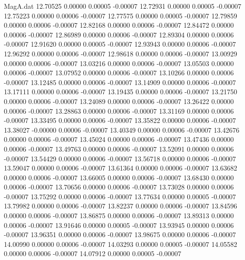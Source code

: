 \begin{filecontents}{MagA.dat}
  12.70525    0.00000    0.00005   -0.00007
  12.72931    0.00000    0.00005   -0.00007
  12.75223    0.00000    0.00006   -0.00007
  12.77575    0.00000    0.00005   -0.00007
  12.79859    0.00000    0.00006   -0.00007
  12.82168    0.00000    0.00006   -0.00007
  12.84472    0.00000    0.00006   -0.00007
  12.86989    0.00000    0.00006   -0.00007
  12.89304    0.00000    0.00006   -0.00007
  12.91620    0.00000    0.00005   -0.00007
  12.93943    0.00000    0.00006   -0.00007
  12.96292    0.00000    0.00006   -0.00007
  12.98618    0.00000    0.00006   -0.00007
  13.00929    0.00000    0.00006   -0.00007
  13.03216    0.00000    0.00006   -0.00007
  13.05503    0.00000    0.00006   -0.00007
  13.07952    0.00000    0.00006   -0.00007
  13.10266    0.00000    0.00006   -0.00007
  13.12485    0.00000    0.00006   -0.00007
  13.14909    0.00000    0.00006   -0.00007
  13.17111    0.00000    0.00006   -0.00007
  13.19435    0.00000    0.00006   -0.00007
  13.21750    0.00000    0.00006   -0.00007
  13.24089    0.00000    0.00006   -0.00007
  13.26422    0.00000    0.00006   -0.00007
  13.28863    0.00000    0.00006   -0.00007
  13.31169    0.00000    0.00006   -0.00007
  13.33495    0.00000    0.00006   -0.00007
  13.35822    0.00000    0.00006   -0.00007
  13.38027   -0.00000    0.00006   -0.00007
  13.40349    0.00000    0.00006   -0.00007
  13.42676    0.00000    0.00006   -0.00007
  13.45024    0.00000    0.00006   -0.00007
  13.47436    0.00000    0.00006   -0.00007
  13.49763    0.00000    0.00006   -0.00007
  13.52091    0.00000    0.00006   -0.00007
  13.54429    0.00000    0.00006   -0.00007
  13.56718    0.00000    0.00006   -0.00007
  13.59047    0.00000    0.00006   -0.00007
  13.61364    0.00000    0.00006   -0.00007
  13.63682    0.00000    0.00006   -0.00007
  13.66005    0.00000    0.00006   -0.00007
  13.68430    0.00000    0.00006   -0.00007
  13.70656    0.00000    0.00006   -0.00007
  13.73028    0.00000    0.00006   -0.00007
  13.75292    0.00000    0.00006   -0.00007
  13.77634    0.00000    0.00005   -0.00007
  13.79982    0.00000    0.00006   -0.00007
  13.82237    0.00000    0.00006   -0.00007
  13.84596    0.00000    0.00006   -0.00007
  13.86875    0.00000    0.00006   -0.00007
  13.89313    0.00000    0.00006   -0.00007
  13.91646    0.00000    0.00005   -0.00007
  13.93945    0.00000    0.00006   -0.00007
  13.96351    0.00000    0.00006   -0.00007
  13.98675    0.00000    0.00006   -0.00007
  14.00990    0.00000    0.00006   -0.00007
  14.03293    0.00000    0.00005   -0.00007
  14.05582    0.00000    0.00006   -0.00007
  14.07912    0.00000    0.00005   -0.00007

\end{filecontents}
